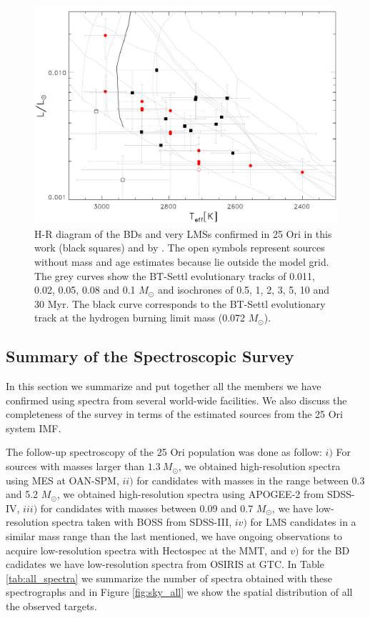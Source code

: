 \documentclass[12pt]{article}
\begin{document}
\begin{figure}%
	\includegraphics[width=1.0\textwidth]{HR_OSIRIS.pdf}
	\caption[H-R diagram of the so far confirmed members with OSIRIS spectra.]{H-R diagram of the BDs and very LMSs confirmed in 25 Ori in this work (black squares) and by \citet[red circles; ][]{Downes2015}. The open symbols represent sources without mass and age estimates because lie outside the model grid. The grey curves show the BT-Settl evolutionary tracks of 0.011, 0.02, 0.05, 0.08 and 0.1 $M_\odot$ and isochrones of 0.5, 1, 2, 3, 5, 10 and 30 Myr. The black curve corresponds to the BT-Settl evolutionary track at the hydrogen burning limit mass (0.072 $M_\odot$).}
	\label{fig_OSIRIS:HR}
\end{figure}

\subsection{Summary of the Spectroscopic Survey}
\label{sec:spectra}
In this section we summarize and put together all the members we have confirmed using spectra from several world-wide facilities. We also discuss the completeness of the survey in terms of the estimated sources from the 25 Ori system IMF. 

The follow-up spectroscopy of the 25 Ori population was done as follow: $i)$ For sources with masses larger than $1.3\ M_\odot$, we obtained high-resolution spectra using MES at OAN-SPM, $ii)$ for candidates with masses in the range between 0.3 and 5.2 $M_\odot$, we obtained high-resolution spectra using APOGEE-2 from SDSS-IV, $iii)$ for candidates with masses between 0.09 and 0.7 $M_\odot$, we have low-resolution spectra taken with BOSS from SDSS-III, $iv)$ for LMS candidates in a similar mass range than the last mentioned, we have ongoing observations to acquire low-resolution spectra with Hectospec at the MMT, and $v)$ for the BD cadidates we have low-resolution spectra from OSIRIS at GTC. In Table \ref{tab:all_spectra} we summarize the number of spectra obtained with these spectrographs and in Figure \ref{fig:sky_all} we show the spatial distribution of all the observed targets.
\end{document}

